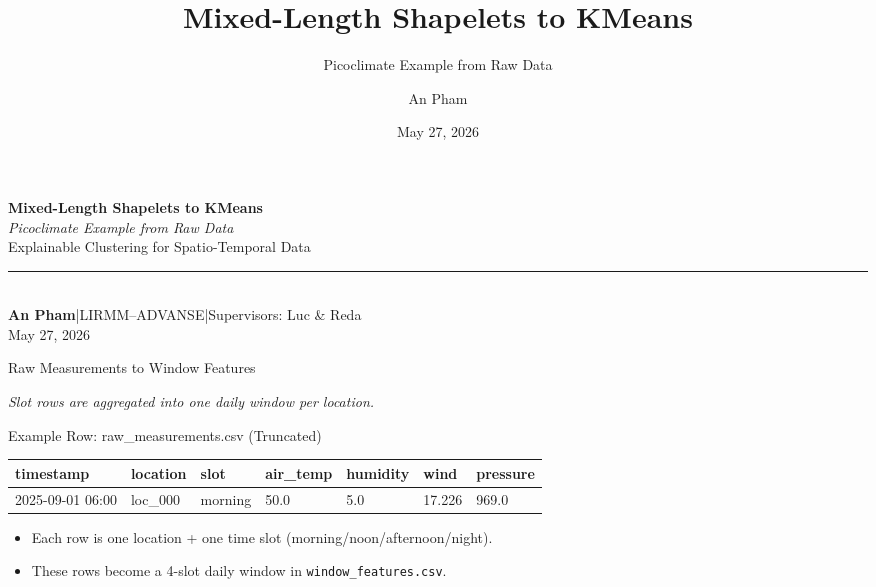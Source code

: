 \documentclass[aspectratio=169]{beamer}
\title{\textbf{Mixed-Length Shapelets to KMeans}}
\subtitle{Picoclimate Example from Raw Data}
\author{An Pham}
\institute{LIRMM--ADVANSE, Universit\'e de Montpellier}
\date{May 27, 2026}
\begin{document}
{
\begin{frame}[plain]
\vspace{1.1cm}
{\color{white}\huge\bfseries Mixed-Length Shapelets to KMeans}\\[5pt]
{\color{cteal}\large\itshape Picoclimate Example from Raw Data}\\[8pt]
{\color{caccent}\small Explainable Clustering for Spatio-Temporal Data}\\[0.6cm]
{\color{cmid}\rule{5.6cm}{0.8pt}}\\[5pt]
{\color{caccent}\footnotesize\textbf{An Pham}\quad|\quad LIRMM--ADVANSE\quad|\quad Supervisors: Luc \& Reda}\\[2pt]
{\color{caccent}\footnotesize May 27, 2026}
\end{frame}}

\begin{frame}{Raw Measurements to Window Features}
\begin{center}
\end{center}
\vspace{4pt}
{\scriptsize\itshape Slot rows are aggregated into one daily window per location.}
\end{frame}

\begin{frame}{Example Row: raw\_measurements.csv (Truncated)}
\scriptsize
\begin{tabular}{@{}lllllll@{}}
\toprule
\textbf{timestamp} & \textbf{location} & \textbf{slot} & \textbf{air\_temp} & \textbf{humidity} & \textbf{wind} & \textbf{pressure} \\
\midrule
2025-09-01 06:00 & loc\_000 & morning & 50.0 & 5.0 & 17.226 & 969.0 \\
\bottomrule
\end{tabular}
\vspace{6pt}
\begin{itemize}\footnotesize\setlength\itemsep{4pt}
  \item Each row is one location + one time slot (morning/noon/afternoon/night).
  \item These rows become a 4-slot daily window in \texttt{window\_features.csv}.
\end{itemize}
\end{frame}
\end{document}
